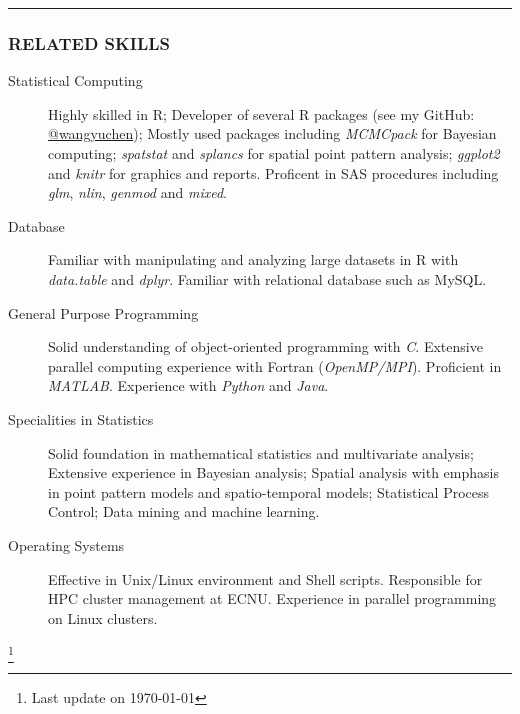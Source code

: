 \documentclass[11pt]{article}
\newcommand{\CPP}
{C\nolinebreak[4]\hspace{-.05em}\raisebox{.22ex}{\footnotesize\bf ++}}
\begin{document}
	\vspace{0.2em}
	\hrule

	\subsubsection*{\centering RELATED SKILLS}
	\vspace{-.3em}

	\begin{description}
		\item[Statistical Computing] Highly skilled in R; Developer of several R packages (see my GitHub: \href{https://www.github.com/wangyuchen}{@wangyuchen}); Mostly used packages including \emph{MCMCpack} for Bayesian computing; \emph{spatstat} and \emph{splancs} for spatial point pattern analysis; \emph{ggplot2} and \emph{knitr} for graphics and reports. Proficent in SAS procedures including \emph{glm}, \emph{nlin}, \emph{genmod} and \emph{mixed}.
		\item[Database] Familiar with manipulating and analyzing large datasets in R with \emph{data.table} and \emph{dplyr}. Familiar with relational database such as MySQL.
		\item[General Purpose Programming] Solid understanding of object-oriented programming with \emph{\CPP}. Extensive parallel computing experience with Fortran (\emph{OpenMP/MPI}). Proficient in \emph{MATLAB}. Experience with \emph{Python} and \emph{Java}.
		\item[Specialities in Statistics] Solid foundation in mathematical statistics and multivariate analysis; Extensive experience in Bayesian analysis; Spatial analysis with emphasis in point pattern models and spatio-temporal models; Statistical Process Control; Data mining and machine learning.
		\item[Operating Systems] Effective in Unix/Linux environment and Shell scripts. Responsible for HPC cluster management at ECNU. Experience in parallel programming on Linux clusters.
	\end{description}


\let\thefootnote\relax\footnote{Last update on \today}
\end{document}
